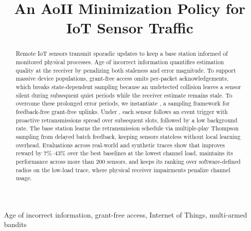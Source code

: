 \documentclass[conference]{IEEEtran}
\begin{document}
\title{An AoII Minimization Policy for IoT Sensor Traffic}

\author{
}

\maketitle

\begin{abstract}
  Remote IoT sensors transmit sporadic updates to keep a base station informed of monitored physical processes.
  Age of incorrect information quantifies estimation quality at the receiver by penalizing both staleness and error magnitude.
  To support massive device populations, grant-free access omits per-packet acknowledgements, which breaks state-dependent sampling because an undetected collision leaves a sensor silent during subsequent quiet periods while the receiver estimate remains stale.
  To overcome these prolonged error periods, we instantiate \tool, a sampling framework for feedback-free grant-free uplinks.
  Under \tool, each sensor follows an event trigger with proactive retransmissions spread over subsequent slots, followed by a low background rate.
  The base station learns the retransmission schedule via multiple-play Thompson sampling from delayed batch feedback, keeping sensors stateless without local learning overhead.
  Evaluations across real-world and synthetic traces show that \tool improves reward by 7\%--43\% over the best baselines at the lowest channel load, maintains its performance across more than 200 sensors, and keeps its ranking over software-defined radios on the low-load trace, where physical receiver impairments penalize channel usage.
\end{abstract}

\begin{IEEEkeywords}
  Age of incorrect information, grant-free access, Internet of Things, multi-armed bandits
\end{IEEEkeywords}
\end{document}
